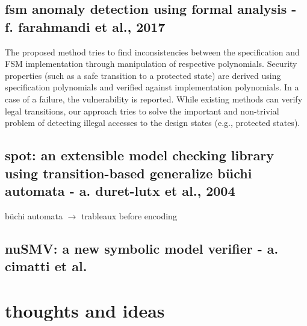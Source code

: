 \documentclass[]{article}
\begin{document}
\subsection{fsm anomaly detection using formal analysis - f. farahmandi et al., 2017}

The proposed method tries to find inconsistencies between the specification and FSM implementation through manipulation of respective polynomials.
Security properties (such as a safe transition to a protected state) are derived using specification polynomials and verified against implementation polynomials. In a case of a failure, the vulnerability is reported. While existing methods can verify legal transitions, our approach tries to solve the important and non-trivial problem of detecting illegal accesses to the design states (e.g., protected states). 

\subsection{spot: an extensible model checking library using transition-based generalize b\"uchi automata - a. duret-lutx et al., 2004}

b\"uchi automata $\rightarrow$ trableaux before encoding 

\subsection{nuSMV: a new symbolic model verifier - a. cimatti et al.}


\section{thoughts and ideas}
\end{document}
